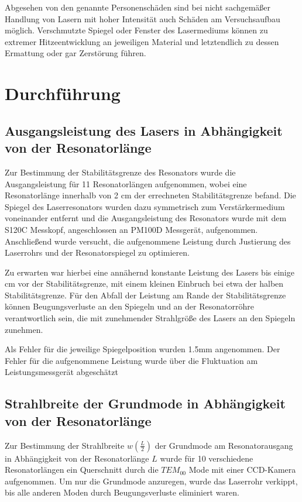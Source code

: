 \documentclass[bigchapter,colorback,accentcolor=tud4b,linedtoc,11pt]{tudreport}
\numberwithin{equation}{subsection}
\begin{document}
Abgesehen von den genannte Personenschäden sind bei nicht sachgemäßer Handlung von Lasern mit hoher Intensität auch Schäden am Versuchsaufbau möglich. Verschmutzte Spiegel oder Fenster des Lasermediums können zu extremer Hitzeentwicklung an jeweiligen Material und letztendlich zu dessen Ermattung oder gar Zerstörung führen.
\cite{GefahrenLaser}
\chapter{Durchführung}
\section{Ausgangsleistung des Lasers in Abhängigkeit von der Resonatorlänge}
Zur Bestimmung der Stabilitätsgrenze des Resonators wurde die Ausgangsleistung für 11 Resonatorlängen aufgenommen, wobei eine Resonatorlänge innerhalb von 2 cm der errechneten Stabilitätsgrenze befand.
Die Spiegel des Laserresonators wurden dazu symmetrisch zum Verstärkermedium voneinander entfernt und die Ausgangsleistung des Resonators wurde mit dem S120C Messkopf, angeschlossen an PM100D Messgerät, aufgenommen. Anschließend wurde versucht, die aufgenommene Leistung durch Justierung des Laserrohrs und der Resonatorspiegel zu optimieren.

Zu erwarten war hierbei eine annähernd konstante Leistung des Lasers bis einige cm vor der Stabilitätsgrenze, mit einem kleinen Einbruch bei etwa der halben Stabilitätsgrenze.
Für den Abfall der Leistung am Rande der Stabilitätsgrenze können Beugungsverluste an den Spiegeln und an der Resonatorröhre verantwortlich sein, die mit zunehmender Strahlgröße des Lasers an den Spiegeln zunehmen.

Als Fehler für die jeweilige Spiegelposition wurden 1.5mm angenommen. Der Fehler für die aufgenommene Leistung wurde über die Fluktuation am Leistungsmessgerät abgeschätzt

\FloatBarrier
\section{Strahlbreite der Grundmode in Abhängigkeit von der Resonatorlänge}
Zur Bestimmung der Strahlbreite \(w\left(\frac{L}{2}\right)\) der Grundmode am Resonatorausgang in Abhängigkeit von der Resonatorlänge \(L\) wurde für 10 verschiedene Resonatorlängen ein Querschnitt durch die $TEM_{00}$ Mode mit einer CCD-Kamera aufgenommen. Um nur die Grundmode anzuregen, wurde das Laserrohr verkippt, bis alle anderen Moden durch Beugungsverluste eliminiert waren.
\end{document}
